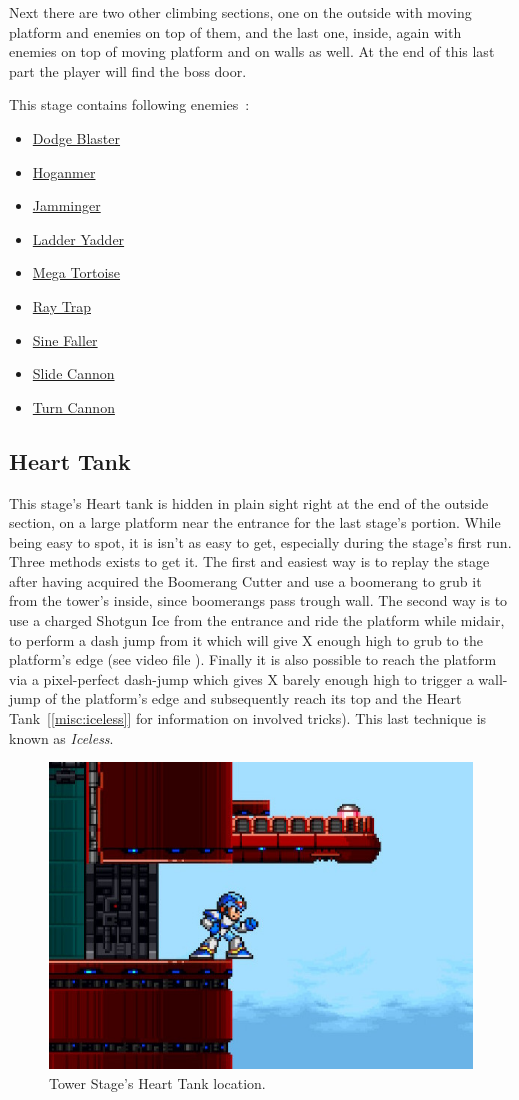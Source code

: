 Next there are two other climbing sections, one on the outside with moving platform and enemies on top of them, and the last one, inside, again with enemies on top of moving platform and on walls as well. At the end of this last part the player will find the boss door.


This stage contains following enemies~\cite{wiki:Tower}:

\begin{itemize}
	\item \hyperlink{enem:Dodge_Blaster}{Dodge Blaster}
	\item \hyperlink{enem:Hoganmer}{Hoganmer}
	\item \hyperlink{enem:Jamminger}{Jamminger}
	\item \hyperlink{enem:Ladder_Yadder}{Ladder Yadder}
	\item \hyperlink{enem:Mega_Tortoise}{Mega Tortoise}
	\item \hyperlink {enem:Ray_Trap}{Ray Trap}
	\item \hyperlink{enem:Sine_Faller}{Sine Faller}
	\item \hyperlink{enem:Slide_Cannon}{Slide Cannon}
	\item \hyperlink{enem:Turn_Cannon}{Turn Cannon}
\end{itemize}

\subsection{Heart Tank}
This stage's Heart tank is hidden in plain sight right at the end of the outside section, on a large platform near the entrance for the last stage's portion. While being easy to spot, it is isn't as easy to get, especially during the stage's first run. Three methods exists to get it. The first and easiest way is to replay the stage after having acquired the Boomerang Cutter and use a boomerang to grub it from the tower's inside, since boomerangs pass trough wall. The second way is to use a charged Shotgun Ice from the entrance and ride the platform while midair, to perform a dash jump from it which will give X enough high to grub to the platform's edge (see video file ). Finally it is also possible to reach the platform via a pixel-perfect dash-jump which gives X barely enough high to trigger a wall-jump of the platform's edge and subsequently reach its top and the Heart Tank~[\ref{misc:iceless}] for information on involved tricks). This last technique is known as \textit{Iceless}. 
\begin{figure}[htp]
	\centering
	\includegraphics[width=0.4\linewidth]{figures/X1/Boomer_kuwanger/Tower_heart.jpg}
	\caption{Tower Stage's Heart Tank location.}
\end{figure}

